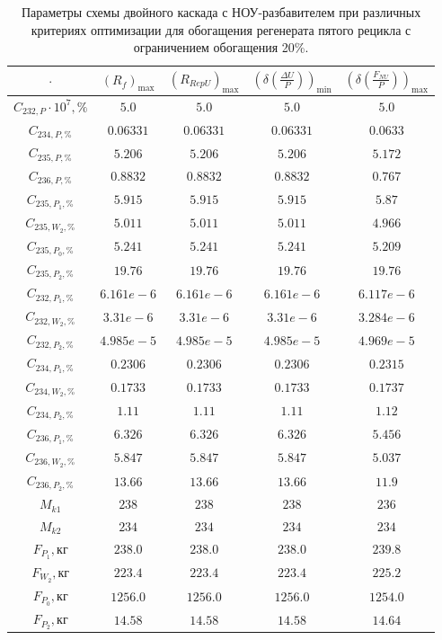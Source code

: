 \begin{table}
    \begin{tabular}{ccccc}
        $\cdot$ & $(R_f)_\text{max}$ & $(R_{RepU})_\text{max}$ & $(\delta(\frac{\Delta U}{P}))_\text{min}$ & $(\delta(\frac{F_{NU}}{P}))_\text{max}$\\ \hline
        $C_{232,P}\cdot10^{7}, \%$ & $5.0$ & $5.0$ & $5.0$ & $5.0$\\ \hline
        $C_{234,P, \%}$ & $0.06331$ & $0.06331$ & $0.06331$ & $0.0633$\\ \hline
        $C_{235,P, \%}$ & $5.206$ & $5.206$ & $5.206$ & $5.172$\\ \hline
        $C_{236,P, \%}$ & $0.8832$ & $0.8832$ & $0.8832$ & $0.767$\\ \hline
        $C_{235,P_1, \%}$ & $5.915$ & $5.915$ & $5.915$ & $5.87$\\ \hline
        $C_{235,W_2, \%}$ & $5.011$ & $5.011$ & $5.011$ & $4.966$\\ \hline
        $C_{235,P_0, \%}$ & $5.241$ & $5.241$ & $5.241$ & $5.209$\\ \hline
        $C_{235,P_2, \%}$ & $19.76$ & $19.76$ & $19.76$ & $19.76$\\ \hline
        $C_{232,P_1, \%}$ & $6.161e-6$ & $6.161e-6$ & $6.161e-6$ & $6.117e-6$\\ \hline
        $C_{232,W_2, \%}$ & $3.31e-6$ & $3.31e-6$ & $3.31e-6$ & $3.284e-6$\\ \hline
        $C_{232,P_2, \%}$ & $4.985e-5$ & $4.985e-5$ & $4.985e-5$ & $4.969e-5$\\ \hline
        $C_{234,P_1, \%}$ & $0.2306$ & $0.2306$ & $0.2306$ & $0.2315$\\ \hline
        $C_{234,W_2, \%}$ & $0.1733$ & $0.1733$ & $0.1733$ & $0.1737$\\ \hline
        $C_{234,P_2, \%}$ & $1.11$ & $1.11$ & $1.11$ & $1.12$\\ \hline
        $C_{236,P_1, \%}$ & $6.326$ & $6.326$ & $6.326$ & $5.456$\\ \hline
        $C_{236,W_2, \%}$ & $5.847$ & $5.847$ & $5.847$ & $5.037$\\ \hline
        $C_{236,P_2, \%}$ & $13.66$ & $13.66$ & $13.66$ & $11.9$\\ \hline
        $M_{k1}$ & $238$ & $238$ & $238$ & $236$\\ \hline
        $M_{k2}$ & $234$ & $234$ & $234$ & $234$\\ \hline
        $F_{P_1}, \text{кг}$ & $238.0$ & $238.0$ & $238.0$ & $239.8$\\ \hline
        $F_{W_2}, \text{кг}$ & $223.4$ & $223.4$ & $223.4$ & $225.2$\\ \hline
        $F_{P_0}, \text{кг}$ & $1256.0$ & $1256.0$ & $1256.0$ & $1254.0$\\ \hline
        $F_{P_2}, \text{кг}$ & $14.58$ & $14.58$ & $14.58$ & $14.64$\\ \hline
    \end{tabular}
    \caption{Параметры схемы двойного каскада с НОУ-разбавителем при различных критериях оптимизации для обогащения регенерата пятого рецикла с ограничением обогащения 20\%.{\label{2opt5_20}}}
\end{table}


